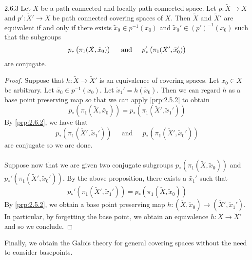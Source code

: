 \documentclass[a4paper]{article}
\begin{document}
\begin{prp}{}{2.6.3} Let $X$ be a path connected and locally path connected space. Let $p:\tilde{X}\to X$ and $p':\tilde{X}'\to X$ be path connected covering spaces of $X$. Then $\tilde{X}$ and $\tilde{X}'$ are equivalent if and only if there exists $\tilde{x}_0\in p^{-1}(x_0)$ and $\tilde{x}_0'\in (p')^{-1}(x_0)$ such that the subgroups $$p_\ast\left(\pi_1(\tilde{X},\tilde{x}_0)\right)\text{\;\;\;\; and \;\;\;\;}p_\ast'\left(\pi_1(\tilde{X}',\tilde{x}_0')\right)$$ are conjugate. \tcbline
\begin{proof}
Suppose that $h:\tilde{X}\to\tilde{X}'$ is an equivalence of covering spaces. Let $x_0\in X$ be arbitrary. Let $\tilde{x_0}\in p^{-1}(x_0)$. Let $\tilde{x}_1'=h(\tilde{x}_0)$. Then we can regard $h$ as a base point preserving map so that we can apply \ref{prp:2.5.2} to obtain $$p_\ast(\pi_1(\tilde{X},\tilde{x_0}))=p_\ast(\pi_1(\tilde{X}',\tilde{x}_1'))$$ By \ref{prp:2.6.2}, we have that $$p_\ast(\pi_1(\tilde{X}',\tilde{x}_1'))\;\;\;\;\text{ and }\;\;\;\;p_\ast(\pi_1(\tilde{X}',\tilde{x}_0'))$$ are conjugate so we are done. \\~\\

Suppose now that we are given two conjugate subgroups $p_\ast\left(\pi_1(\tilde{X},\tilde{x}_0)\right)$ and $p_\ast'\left(\pi_1(\tilde{X}',\tilde{x}_0')\right)$. By the above proposition, there exists a $\tilde{x_1}'$ such that $$p_\ast'\left(\pi_1(\tilde{X}',\tilde{x}_1')\right)=p_\ast\left(\pi_1(\tilde{X},\tilde{x}_0)\right)$$ By \ref{prp:2.5.2}, we obtain a base point preserving map $h:(\tilde{X},\tilde{x}_0)\to(\tilde{X}',\tilde{x}_1')$. In particular, by forgetting the base point, we obtain an equivalence $h:\tilde{X}\to\tilde{X}'$ and so we conclude. 
\end{proof}
\end{prp}

Finally, we obtain the Galois theory for general covering spaces without the need to consider basepoints. 
\end{document}
